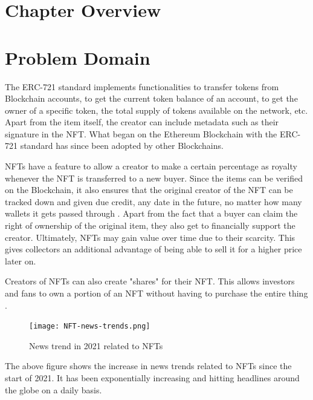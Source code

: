 

\section{Chapter Overview}

\section{Problem Domain}

The ERC-721 standard implements functionalities to transfer tokens from Blockchain accounts, to get the current token balance of an account, to get the owner of a specific token, the total supply of tokens available on the network, etc. Apart from the item itself, the creator can include metadata such as their signature in the NFT. What began on the Ethereum Blockchain with the ERC-721 standard has since been adopted by other Blockchains. 


NFTs have a feature to allow a creator to make a certain percentage as royalty whenever the NFT is transferred to a new buyer. Since the items can be verified on the Blockchain, it also ensures that the original creator of the NFT can be tracked down and given due credit, any date in the future, no matter how many wallets it gets passed through \autocite{chevet_blockchain_2018}. Apart from the fact that a buyer can claim the right of ownership of the original item, they also get to financially support the creator. Ultimately, NFTs may gain value over time due to their scarcity. This gives collectors an additional advantage of being able to sell it for a higher price later on.

Creators of NFTs can also create "shares" for their NFT. This allows investors and fans to own a portion of an NFT without having to purchase the entire thing \autocite{noauthor_erc-721_nodate}.

\begin{figure}[h!]
\centering
\texttt{[image: NFT-news-trends.png]}
\caption{News trend in 2021 related to NFTs \autocite{dowling_fertile_2021}}
\end{figure}

The above figure shows the increase in news trends related to NFTs since the start of 2021. It has been exponentially increasing and hitting headlines around the globe on a daily basis.

